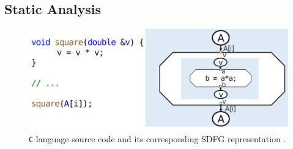 \subsection{Static Analysis}\label{sec:static_analysis}
\begin{figure}
  \centering
  \includegraphics[width=\linewidth]{pictures/SDFG.png}
  \caption{\texttt{C} language source code and its corresponding SDFG representation \cite{calotoiu2022lifting}.}
  \label{fig:sdfg}
\end{figure}

